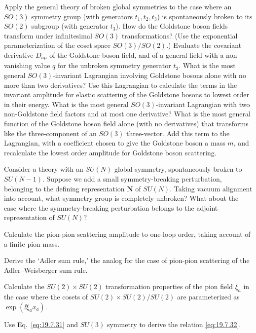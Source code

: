 
\begin{enumerate}
 Apply the general theory of broken global symmetries to the case where an $SO(3)$ symmetry group (with generators $t_1,t_2,t_3$) is spontaneously broken to its $SO(2)$ subgroup (with generator $t_3$). How do the Goldstone boson fields transform under infinitesimal $SO(3)$ transformations? (Use the exponential parameterization of the coset space $SO(3)/SO(2)$.) Evaluate the covariant derivative $D_{a\mu}$ of the Goldstone boson field, and of a general field with a non-vanishing value $q$ for the unbroken symmetry generator $t_3$. What is the most general $SO(3)$-invariant Lagrangian involving Goldstone bosons alone with no more than two derivatives? Use this Lagrangian to calculate the terms in the invariant amplitude for elastic scattering of the Goldstone bosons to lowest order in their energy. What is the most general $SO(3)$-invariant Lagrangian with two non-Goldstone field factors and at most one derivative? What is the most general function of the Goldstone boson field alone (with no derivatives) that transforms like the three-component of an $SO(3)$ three-vector. Add this term to the Lagrangian, with a coefficient chosen to give the Goldstone boson a mass $m$, and recalculate the lowest order amplitude for Goldstone boson scattering.

 Consider a theory with an $SU(N)$ global symmetry, spontaneously broken to $SU(N-1)$. Suppose we add a small symmetry-breaking perturbation, belonging to the defining representation $\mathbf N$ of $SU(N)$. Taking vacuum alignment into account, what symmetry group is completely unbroken? What about the case where the symmetry-breaking perturbation belongs to the adjoint representation of $SU(N)$?

 Calculate the pion-pion scattering amplitude to one-loop order, taking account of a finite pion mass.

 Derive the `Adler sum rule,' the analog for the case of pion-pion scattering of the Adler--Weisberger sum rule.

 Calculate the $SU(2)\times SU(2)$ transformation properties of the pion field $\xi_a$ in the case where the cosets of $SU(2)\times SU(2)/SU(2)$ are parameterized as $\exp(\ii\xi_ax_a)$.

 Use Eq.~\eqref{eq:19.7.31} and $SU(3)$ symmetry to derive the relation \eqref{eq:19.7.32}.
\end{enumerate}

